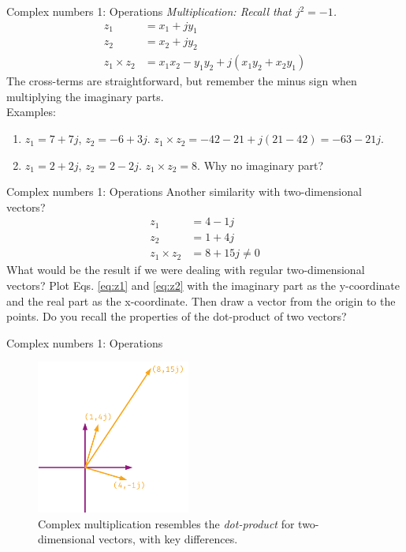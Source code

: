 \documentclass{beamer}
\begin{document}
\begin{frame}{Complex numbers 1: Operations}
\textit{Multiplication: Recall that $j^2 = -1$.}
\begin{align}
z_1 &= x_1+jy_1 \\
z_2 &= x_2 + j y_2 \\
z_1 \times z_2 &= x_1 x_2 - y_1 y_2 + j (x_1 y_2 + x_2 y_1)
\end{align}
The cross-terms are straightforward, but remember the minus sign when multiplying the imaginary parts. \\ \vspace{0.5cm}
Examples:
\begin{enumerate}
\item $z_1 = 7+7j$, $z_2 = -6+3j$.  $z_1 \times z_2 = -42-21 + j(21-42) = -63-21j$.
\item $z_1 = 2+2j$, $z_2 = 2-2j$.  $z_1 \times z_2 = 8$.  Why no imaginary part?
\end{enumerate}
\end{frame}

\begin{frame}{Complex numbers 1: Operations}
Another similarity with two-dimensional vectors?
\begin{align}
z_1 &= 4-1j \label{eq:z1} \\
z_2 &= 1+4j \label{eq:z2} \\
z_1 \times z_2 &= 8 + 15j \neq 0
\end{align}
What would be the result if we were dealing with regular two-dimensional vectors?  Plot Eqs. \ref{eq:z1} and \ref{eq:z2} with the imaginary part as the y-coordinate and the real part as the x-coordinate.  Then draw a vector from the origin to the points.  Do you recall the properties of the \alert{dot-product} of two vectors?
\end{frame}

\begin{frame}{Complex numbers 1: Operations}
\begin{figure}
\centering
\includegraphics[width=0.45\textwidth]{figures/complexNumbers3.pdf}
\caption{\label{fig:complex2} Complex multiplication resembles the \textit{dot-product} for two-dimensional vectors, with key differences.}
\end{figure}
\end{frame}
\end{document}
